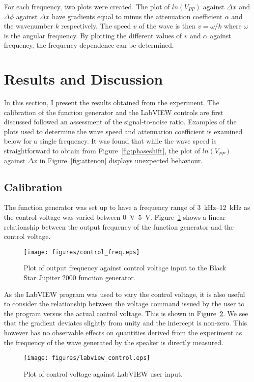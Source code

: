 \documentclass[twocolumn]{article}
\begin{document}
For each frequency, two plots were created. The plot of $ln(V_{PP})$ against $\Delta{x}$ and $\Delta\phi$ against $\Delta{x}$ have gradients equal to minus the attenuation coefficient $\alpha$ and the wavenumber $k$ respectively. The speed $v$ of the wave is then $v = \omega/k$ where $\omega$ is the angular frequency. By plotting the different values of $v$ and $\alpha$ against frequency, the frequency dependence can be determined.

\section{Results and Discussion}
In this section, I present the results obtained from the experiment. The calibration of the function generator and the LabVIEW controls are first discussed followed an assessment of the signal-to-noise ratio. Examples of the plots used to determine the wave speed and attenuation coefficient is examined below for a single frequency. It was found that while the wave speed is straightforward to obtain from Figure~\ref{fig:phaseshift}, the plot of $ln(V_{PP})$ against $\Delta{x}$ in Figure~\ref{fig:attenon} displays unexpected behaviour.
\subsection{Calibration}
The function generator was set up to have a frequency range of \SIrange{3}{12}{\kilo\hertz} as the control voltage was varied between \SIrange{0}{5}{\volt}. Figure~\ref{fig:control_freq} shows a linear relationship between the output frequency of the function generator and the control voltage.
\begin{figure}
    \centering
    \texttt{[image: figures/control\_freq.eps]}
    \caption{Plot of output frequency against control voltage input to the Black Star Jupiter 2000 function generator.}
    \label{fig:control_freq}
\end{figure}
As the LabVIEW program was used to vary the control voltage, it is also useful to consider the relationship between the voltage command issued by the user to the program versus the actual control voltage. This is shown in Figure~\ref{fig:labview_control}. We see that the gradient deviates slightly from unity and the intercept is non-zero. This however has no observable effects on quantities derived from the experiment as the frequency of the wave generated by the speaker is directly measured.
\begin{figure}
    \centering
    \texttt{[image: figures/labview\_control.eps]}
    \caption{Plot of control voltage against LabVIEW user input.}
    \label{fig:labview_control}
\end{figure}
\end{document}
